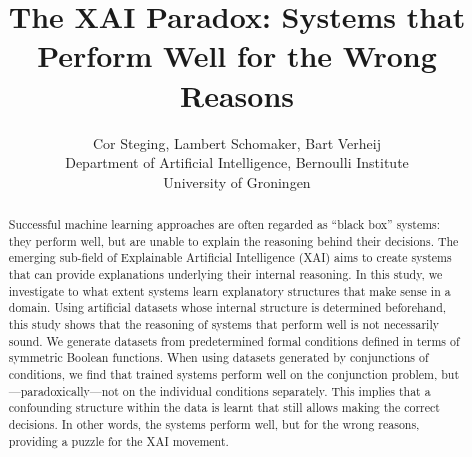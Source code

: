 \documentclass[letterpaper]{article} %
\begin{document}
%
\title{The XAI Paradox: Systems that Perform Well for the Wrong Reasons}
\author{Cor Steging, Lambert Schomaker, Bart Verheij\\
Department of Artificial Intelligence, Bernoulli Institute\\
University of Groningen\\
}
\maketitle
\begin{abstract}
Successful machine learning approaches are often regarded as ``black box'' systems: they perform well, but are unable to explain the reasoning behind their decisions. The emerging sub-field of Explainable Artificial Intelligence (XAI) aims to create systems that can provide explanations underlying their internal reasoning. 
In this study, we investigate to
what extent systems learn explanatory structures that make sense in
a domain. 
Using artificial datasets whose internal structure is determined beforehand, this study shows that the reasoning of systems that perform well is not necessarily sound. 
We generate datasets from predetermined formal conditions defined in terms of symmetric Boolean functions. When using datasets generated by conjunctions of conditions, we find that trained systems perform well on the conjunction problem, but---paradoxically---not on the individual conditions separately. This implies that a confounding
structure within the data is learnt that still allows making the correct decisions. In other words, the systems perform well, but for the wrong reasons, providing a puzzle for the XAI movement.

\end{abstract}
\end{document}
